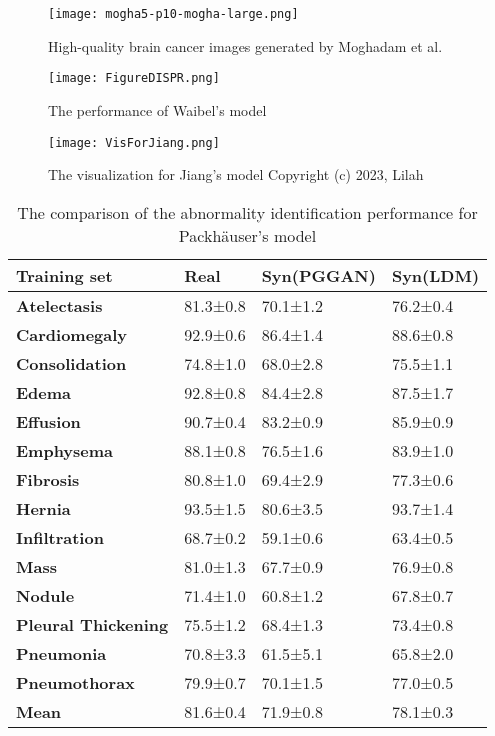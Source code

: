 \documentclass[preprint,12pt,authoryear]{elsarticle}
\begin{document}
\begin{figure}
    \centering
    \centerline{\texttt{[image: mogha5-p10-mogha-large.png]}}
    \caption{High-quality brain cancer images generated by Moghadam et al.}
    \label{fig:enter-label}
\end{figure}

\begin{figure}
    \centering
    \centerline{\texttt{[image: FigureDISPR.png]}}
    \caption{The performance of Waibel's model}
    \label{fig:enter-label}
\end{figure}





\begin{figure}
    \centering
    \centerline{\texttt{[image: VisForJiang.png]}}
    \caption{The visualization for Jiang's model Copyright (c) 2023, Lilah}
    \label{fig:enter-label}
\end{figure}

\begin{table}[]
\begin{tabularx}{\textwidth}{lXXX}
\hline
\textbf{Training set}       & \textbf{Real} & Syn(PGGAN) & Syn(LDM)    \\ \hline
\textbf{Atelectasis}        & 81.3±0.8      & 70.1±1.2   & 76.2±0.4 \\
\textbf{Cardiomegaly}       & 92.9±0.6      & 86.4±1.4   & 88.6±0.8    \\
\textbf{Consolidation}      & 74.8±1.0      & 68.0±2.8   & 75.5±1.1    \\
\textbf{Edema}              & 92.8±0.8      & 84.4±2.8   & 87.5±1.7    \\
\textbf{Effusion}           & 90.7±0.4      & 83.2±0.9   & 85.9±0.9    \\
\textbf{Emphysema}          & 88.1±0.8      & 76.5±1.6   & 83.9±1.0    \\
\textbf{Fibrosis}           & 80.8±1.0      & 69.4±2.9   & 77.3±0.6    \\
\textbf{Hernia}             & 93.5±1.5      & 80.6±3.5   & 93.7±1.4    \\
\textbf{Infiltration}       & 68.7±0.2      & 59.1±0.6   & 63.4±0.5    \\
\textbf{Mass}               & 81.0±1.3      & 67.7±0.9   & 76.9±0.8    \\
\textbf{Nodule}             & 71.4±1.0      & 60.8±1.2   & 67.8±0.7    \\
\textbf{Pleural Thickening} & 75.5±1.2      & 68.4±1.3   & 73.4±0.8    \\
\textbf{Pneumonia}          & 70.8±3.3      & 61.5±5.1   & 65.8±2.0    \\
\textbf{Pneumothorax}       & 79.9±0.7      & 70.1±1.5   & 77.0±0.5    \\ \hline
\textbf{Mean}               & 81.6±0.4      & 71.9±0.8   & 78.1±0.3    \\ \hline
\end{tabularx}
\caption{The comparison of the abnormality identification performance for Packhäuser's model}
\end{table}
\end{document}

